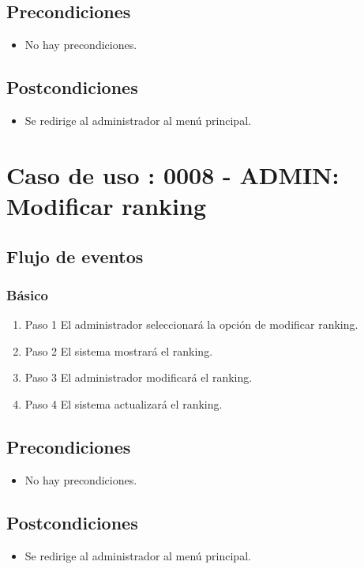 \subsection{Precondiciones}
\begin{itemize}
\item No hay precondiciones.
\end{itemize}
\subsection{Postcondiciones}
\begin{itemize}
\item Se redirige al administrador al menú principal.
\end{itemize}



\section{Caso de uso : 0008 - ADMIN: Modificar ranking}\label{sec:uc0}

\subsection{Flujo de eventos}

\subsubsection{Básico}

\begin{enumerate}
\item Paso 1
El administrador seleccionará la opción de modificar ranking.
\item Paso 2
El sistema mostrará el ranking.
\item Paso 3
El administrador modificará el ranking.
\item Paso 4
El sistema actualizará el ranking.


\end{enumerate}

\subsection{Precondiciones}
\begin{itemize}
\item No hay precondiciones.
\end{itemize}
\subsection{Postcondiciones}
\begin{itemize}
\item Se redirige al administrador al menú principal.
\end{itemize}



